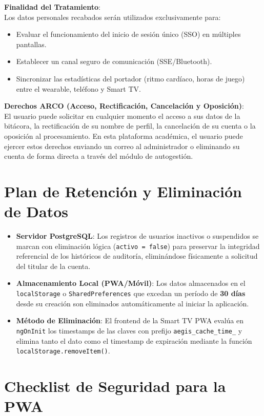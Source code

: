 \documentclass[11pt,a4paper]{article}
\begin{document}
\textbf{Finalidad del Tratamiento}:\\
Los datos personales recabados serán utilizados exclusivamente para:
\begin{itemize}
    \item Evaluar el funcionamiento del inicio de sesión único (SSO) en múltiples pantallas.
    \item Establecer un canal seguro de comunicación (SSE/Bluetooth).
    \item Sincronizar las estadísticas del portador (ritmo cardíaco, horas de juego) entre el wearable, teléfono y Smart TV.
\end{itemize}

\textbf{Derechos ARCO (Acceso, Rectificación, Cancelación y Oposición)}:\\
El usuario puede solicitar en cualquier momento el acceso a sus datos de la bitácora, la rectificación de su nombre de perfil, la cancelación de su cuenta o la oposición al procesamiento. En esta plataforma académica, el usuario puede ejercer estos derechos enviando un correo al administrador o eliminando su cuenta de forma directa a través del módulo de autogestión.

\section{Plan de Retención y Eliminación de Datos}
\begin{itemize}
    \item \textbf{Servidor PostgreSQL}: Los registros de usuarios inactivos o suspendidos se marcan con eliminación lógica (\texttt{activo = false}) para preservar la integridad referencial de los históricos de auditoría, eliminándose físicamente a solicitud del titular de la cuenta.
    \item \textbf{Almacenamiento Local (PWA/Móvil)}: Los datos almacenados en el \texttt{localStorage} o \texttt{SharedPreferences} que excedan un período de \textbf{30 días} desde su creación son eliminados automáticamente al iniciar la aplicación.
    \item \textbf{Método de Eliminación}: El frontend de la Smart TV PWA evalúa en \texttt{ngOnInit} los timestamps de las claves con prefijo \texttt{aegis\_cache\_time\_} y elimina tanto el dato como el timestamp de expiración mediante la función \texttt{localStorage.removeItem()}.
\end{itemize}

\section{Checklist de Seguridad para la PWA}
\end{document}
